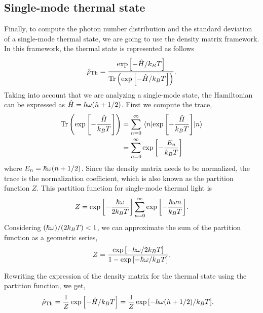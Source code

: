 \documentclass[../main.tex]{subfiles}
\begin{document}
\subsection{Single-mode thermal state}

Finally, to compute the photon number distribution and the standard deviation of a single-mode thermal state, we are going to use the density matrix framework.
In this framework, the thermal state is represented as follows
\begin{gather*}
    \hat{\rho}_{\mathrm{Th}} = \frac{\exp\qty[-\hat{H}/k_BT]}{\Tr\qty(\exp\qty[-\hat{H}/k_BT])}.
\end{gather*}
Taking into account that we are analyzing a single-mode state, the Hamiltonian can be expressed as $\hat{H}=\hbar\omega\qty(\hat{n}+1/2)$.
First we compute the trace,
\begin{align*}
    \Tr\qty(\exp\qty[-\frac{\hat{H}}{k_BT}]) &= \sum_{n=0}^\infty\expval{\exp\qty[-\frac{\hat{H}}{k_BT}]}{n} \\
    &= \sum_{n=0}^\infty\exp\qty[-\frac{E_n}{k_BT}]
\end{align*}
where $E_n=\hbar\omega\qty(n+1/2)$.
Since the density matrix needs to be normalized, the trace is the normalization coefficient, which is also known as the partition function $Z$.
This partition function for single-mode thermal light is
\begin{gather*}
    Z = \exp\qty[-\frac{\hbar\omega}{2k_BT}]\sum_{n=0}^\infty\exp\qty[-\frac{\hbar\omega n}{k_BT}].    
\end{gather*}
Considering $\qty(\hbar\omega)/\qty(2k_BT)<1$, we can approximate the sum of the partition function as a geometric series,
\begin{gather*}
    Z = \frac{\exp\qty[-\hbar\omega/2k_BT]}{1-\exp\qty[-\hbar\omega /k_BT]}.    
\end{gather*}

Rewriting the expression of the density matrix for the thermal state using the partition function, we get,
\begin{align*}
    \hat{\rho}_{\mathrm{Th}}    &= \frac{1}{Z}\exp\qty[-\hat{H}/k_BT] = \frac{1}{Z}\exp\qty[-\hbar\omega\qty(\hat{n}+1/2)/k_BT]. %
\end{align*}
\end{document}
